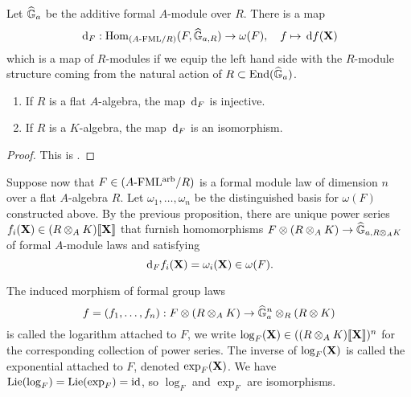 \documentclass[../main.tex]{subfiles}
\begin{document}
Let $\widehat{\mathbb{G}}_a$ be the additive formal $A$-module over $R$. There is a map
\begin{equation} \label{eq:functorinvdifftohom}
  \, \mathrm{d}_{F} : \operatorname{Hom}_{{({A}\text-\allowbreak\mathrm{FML}/{R})}} ({F}, \widehat{\mathbb{G}}_{a,R}) \to \omega({F}), \quad f \mapsto \, \mathrm{d} f(\mathbf{X})
\end{equation}
which is a map of $R$-modules if we equip the left hand side with the $R$-module
structure coming from the natural action of $R \subset \operatorname{End}(\widehat{\mathbb{G}}_a)$. 
\begin{prop}\label{prop:loginvdiff}
  \begin{enumerate}
    \item If $R$ is a flat $A$-algebra, the map $\, \mathrm{d}_F$ is injective.
    \item If $R$ is a $K$-algebra, the map $\, \mathrm{d}_F$ is an isomorphism.
  \end{enumerate}
\begin{proof}
  This is \cite[Proposition 3.2]{hopkins1994equivariant}.
\end{proof}
\end{prop}

Suppose now that $F \in {({A}\text-\allowbreak\mathrm{FML^{arb}}/{R})}$ is a formal module law of dimension $n$
over a flat $A$-algebra $R$. 
Let $\omega_1, \dots, \omega_n$ be the distinguished basis for $\omega(F)$
constructed above. 
By the previous proposition, there are unique power series 
$f_i(\mathbf{X}) \in (R \otimes_A K)\llbracket \mathbf{X} \rrbracket$ that furnish homomorphisms
$F \otimes (R \otimes_A K) \to \widehat{\mathbb{G}}_{a,R\otimes_AK}$ of formal $A$-module laws
and satisfying
\begin{equation*}
  \, \mathrm{d}_F f_i(\mathbf{X}) = \omega_i(\mathbf{X}) \in \omega(F).
\end{equation*}
\begin{defi}
  The induced morphism of formal group laws
  \begin{equation*}
    f = (f_1, \dots, f_n) : F \otimes (R \otimes_A K) \to \widehat{\mathbb{G}}_a^n \otimes_R (R \otimes K)
  \end{equation*}
  is called the logarithm attached to $F$, we write 
  $\log_F(\mathbf{X}) \in ((R \otimes_A K)\llbracket \mathbf{X} \rrbracket)^n$ for the corresponding collection
  of power series. The inverse of $\log_F(\mathbf{X})$ is called the exponential 
  attached to $F$, denoted $\exp_F(\mathbf{X})$. We have $\operatorname{Lie}(\log_F) = \operatorname{Lie}(\exp_F) = \operatorname{id}$,
  so $\log_F$ and $\exp_F$ are isomorphisms.
\end{defi}
\end{document}
